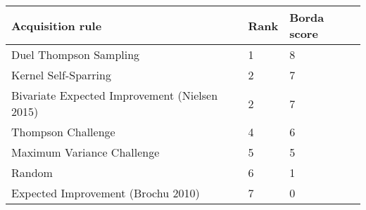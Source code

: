 \begin{tabular}{lll}
Acquisition rule & Rank & Borda score \\ 
\hline 
Duel Thompson Sampling & 1 & 8 \\ 
Kernel Self-Sparring & 2 & 7 \\ 
Bivariate Expected Improvement (Nielsen 2015) & 2 & 7 \\ 
Thompson Challenge & 4 & 6 \\ 
Maximum Variance Challenge & 5 & 5 \\ 
Random & 6 & 1 \\ 
Expected Improvement (Brochu 2010) & 7 & 0 \\ 
\hline 
\end{tabular}